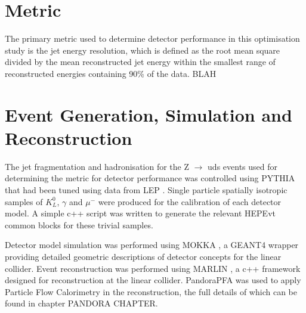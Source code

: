 
\section{Metric}

The primary metric used to determine detector performance in this optimisation study is the jet energy resolution, which is defined as the root mean square divided by the mean reconstructed jet energy within the smallest range of reconstructed energies containing 90\% of the data.  BLAH



\section{Event Generation, Simulation and Reconstruction}

The jet fragmentation and hadronisation for the Z $\rightarrow$ uds events used for determining the metric for detector performance was controlled using PYTHIA \cite{Sjostrand:2006za} that had been tuned using data from LEP \cite{Alexander:1995bk}.  Single particle spatially isotropic samples of $K_{L}^{0}$, $\gamma$ and $\mu^{-}$ were produced for the calibration of each detector model.  A simple c++ script was written to generate the relevant HEPEvt common blocks for these trivial samples. 

Detector model simulation was performed using MOKKA \cite{MoradeFreitas:2002kj}, a GEANT4 \cite{Agostinelli:2002hh} wrapper providing detailed geometric descriptions of detector concepts for the linear collider.  Event reconstruction was performed using MARLIN \cite{Gaede:2006pj}, a c++ framework designed for reconstruction at the linear collider.  PandoraPFA \cite{arXiv:0907.3577, arXiv:1209.4039} was used to apply Particle Flow Calorimetry in the reconstruction, the full details of which can be found in chapter PANDORA CHAPTER.




